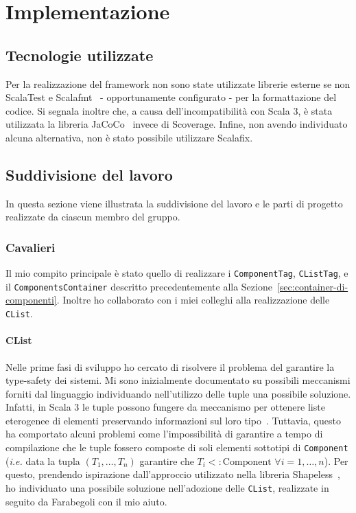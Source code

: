 \chapter{Implementazione}\label{ch:implementazione}

\section{Tecnologie utilizzate}\label{sec:tecnologie-utilizzate}
Per la realizzazione del framework non sono state utilizzate librerie esterne se non ScalaTest e
Scalafmt~\cite{scalafmt} - opportunamente configurato - per la formattazione del codice.
Si segnala inoltre che, a causa dell'incompatibilità con Scala 3, è stata utilizzata la libreria JaCoCo~\cite{jacoco}
invece di Scoverage.
Infine, non avendo individuato alcuna alternativa, non è stato possibile utilizzare Scalafix.

\section{Suddivisione del lavoro}\label{sec:suddivisione-del-lavoro}
In questa sezione viene illustrata la suddivisione del lavoro e le parti di progetto realizzate da ciascun membro del
gruppo.

\subsection{Cavalieri}\label{subsec:giacomo-cavalieri}
Il mio compito principale è stato quello di realizzare i \texttt{ComponentTag}, \texttt{CListTag},
e il \texttt{ComponentsContainer} descritto precedentemente alla Sezione~\ref{sec:container-di-componenti}.
Inoltre ho collaborato con i miei colleghi alla realizzazione delle \texttt{CList}.

\subsubsection{CList}
Nelle prime fasi di sviluppo ho cercato di risolvere il problema del garantire la type-safety dei sistemi.
Mi sono inizialmente documentato su possibili meccanismi forniti dal linguaggio individuando nell'utilizzo delle
tuple una possibile soluzione.
Infatti, in Scala 3 le tuple possono fungere da meccanismo per ottenere liste eterogenee di elementi
preservando informazioni sul loro tipo~\cite{tuples}.
Tuttavia, questo ha comportato alcuni problemi come l'impossibilità di garantire a tempo di compilazione che le tuple
fossero composte di soli elementi sottotipi di \texttt{Component}
(\textit{i.e.} data la tupla $(T_1,\dots,T_n)$ garantire che $T_i <: \text{Component } \forall i=1,\dots,n$).
Per questo, prendendo ispirazione dall'approccio utilizzato nella libreria Shapeless~\cite{shapeless},
ho individuato una possibile soluzione nell'adozione delle \texttt{CList}, realizzate in seguito
da Farabegoli con il mio aiuto.

